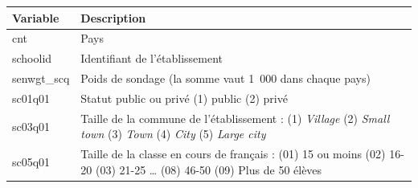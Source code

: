 \documentclass[12pt,twosided, notitlepage]{book}
\begin{document}
\begin{longtable}[]{@{}ll@{}}
\toprule
\begin{minipage}[b]{0.38\columnwidth}\raggedright
\textbf{Variable}\strut
\end{minipage} & \begin{minipage}[b]{0.56\columnwidth}\raggedright
\textbf{Description}\strut
\end{minipage}\tabularnewline
\midrule
\endhead
\begin{minipage}[t]{0.38\columnwidth}\raggedright
cnt\strut
\end{minipage} & \begin{minipage}[t]{0.56\columnwidth}\raggedright
Pays\strut
\end{minipage}\tabularnewline
\begin{minipage}[t]{0.38\columnwidth}\raggedright
schoolid\strut
\end{minipage} & \begin{minipage}[t]{0.56\columnwidth}\raggedright
Identifiant de l'établissement\strut
\end{minipage}\tabularnewline
\begin{minipage}[t]{0.38\columnwidth}\raggedright
senwgt\_scq\strut
\end{minipage} & \begin{minipage}[t]{0.56\columnwidth}\raggedright
Poids de sondage (la somme vaut 1~000 dans chaque pays)\strut
\end{minipage}\tabularnewline
\begin{minipage}[t]{0.38\columnwidth}\raggedright
sc01q01\strut
\end{minipage} & \begin{minipage}[t]{0.56\columnwidth}\raggedright
Statut public ou privé (1) public (2) privé\strut
\end{minipage}\tabularnewline
\begin{minipage}[t]{0.38\columnwidth}\raggedright
sc03q01\strut
\end{minipage} & \begin{minipage}[t]{0.56\columnwidth}\raggedright
Taille de la commune de l'établissement : (1) \emph{Village} (2)
\emph{Small town} (3) \emph{Town} (4) \emph{City} (5) \emph{Large
city}\strut
\end{minipage}\tabularnewline
\begin{minipage}[t]{0.38\columnwidth}\raggedright
sc05q01\strut
\end{minipage} & \begin{minipage}[t]{0.56\columnwidth}\raggedright
Taille de la classe en cours de français : (01) 15 ou moins (02) 16-20
(03) 21-25 \ldots{} (08) 46-50 (09) Plus de 50 élèves\strut
\end{minipage}\tabularnewline
\bottomrule
\end{longtable}
\end{document}
